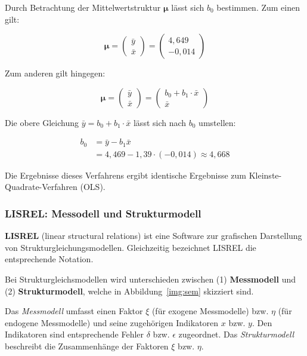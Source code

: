 \documentclass{article}
\numberwithin{equation}{section}
\begin{document}
Durch Betrachtung der Mittelwertstruktur $\boldsymbol\mu$ lässt sich $b_0$ bestimmen. Zum einen gilt:

\begin{equation}
\boldsymbol\mu = \begin{pmatrix}\bar y\\ \bar x\end{pmatrix} = \begin{pmatrix}4,649\\ -0,014\end{pmatrix}
\end{equation}

Zum anderen gilt hingegen:

\begin{equation}
\boldsymbol\mu = \begin{pmatrix}\bar y\\ \bar x\end{pmatrix} =
\begin{pmatrix}
b_0 + b_1 \cdot \bar x\\
\bar x
\end{pmatrix}
\end{equation}

Die obere Gleichung $\bar y = b_0 + b_1 \cdot \bar x$ lässt sich nach $b_0$ umstellen:

\begin{equation}
\begin{split}
b_0 &= \bar y - b_1 \bar x\\
&= 4,469 - 1,39 \cdot (-0,014) \approx 4,668
\end{split}
\end{equation}

Die Ergebnisse dieses Verfahrens ergibt identische Ergebnisse zum Kleinste-Quadrate-Verfahren (OLS).

\subsubsection{LISREL: Messodell und Strukturmodell}

\textbf{LISREL} (linear structural relations) ist eine Software zur grafischen Darstellung von Strukturgleichungsmodellen. Gleichzeitig bezeichnet LISREL die entsprechende Notation.

Bei Strukturgleichsmodellen wird unterschieden zwischen (1) \textbf{Messmodell} und (2) \textbf{Strukturmodell}, welche in Abbildung~\ref{img:sem} skizziert sind.

Das \emph{Messmodell} umfasst einen Faktor $\xi$ (für exogene Messmodelle) bzw. $\eta$ (für endogene Messmodelle) und seine zugehörigen Indikatoren $x$ bzw. $y$. Den Indikatoren sind entsprechende Fehler $\delta$ bzw. $\epsilon$ zugeordnet. Das \emph{Strukturmodell} beschreibt die Zusammenhänge der Faktoren $\xi$ bzw. $\eta$.
\end{document}
